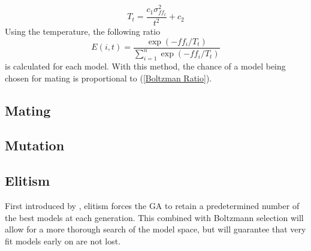 \begin{equation}
T_{t}=\frac{c_{1}\sigma_{ff_{t}}^{2}}{t^{2}}+c_{2}
\end{equation}
Using the temperature, the following ratio
\begin{equation}
E\left(i,t\right)=\frac{\exp\left(-ff_{i}/T_{t}\right)}{\sum\limits _{i=1}^{n}\exp\left(-ff_{i}/T_{t}\right)}\label{Boltzman Ratio}
\end{equation}
is calculated for each model. With this method, the chance of a model
being chosen for mating is proportional to (\ref{Boltzman Ratio}).


\subsection{Mating}


\subsection{Mutation}


\subsection{Elitism}

First introduced by \citet{DeJong:1975}, elitism forces the GA to
retain a predetermined number of the \textquotedbl{}best\textquotedbl{}
models at each generation. This combined with Boltzmann selection
will allow for a more thorough search of the model space, but will
guarantee that very fit models early on are not lost.
